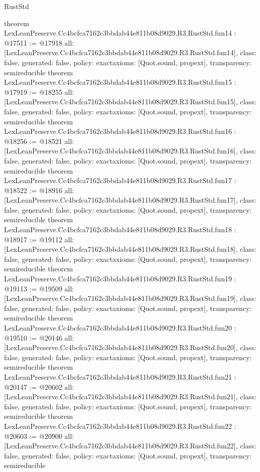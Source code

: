 \begin{lexlean}{RustStd}
\begin{coremodule}
{}
theorem LexLeanPreserve.Cc4bcfca7162c3bbdab44e811b08d9029.R3.RustStd.fun14 : @17511 := @17918 {
  all: [LexLeanPreserve.Cc4bcfca7162c3bbdab44e811b08d9029.R3.RustStd.fun14],
  class: false,
  generated: false,
  policy: exact{axioms: [Quot.sound, propext]},
  transparency: semireducible
}
theorem LexLeanPreserve.Cc4bcfca7162c3bbdab44e811b08d9029.R3.RustStd.fun15 : @17919 := @18255 {
  all: [LexLeanPreserve.Cc4bcfca7162c3bbdab44e811b08d9029.R3.RustStd.fun15],
  class: false,
  generated: false,
  policy: exact{axioms: [Quot.sound, propext]},
  transparency: semireducible
}
theorem LexLeanPreserve.Cc4bcfca7162c3bbdab44e811b08d9029.R3.RustStd.fun16 : @18256 := @18521 {
  all: [LexLeanPreserve.Cc4bcfca7162c3bbdab44e811b08d9029.R3.RustStd.fun16],
  class: false,
  generated: false,
  policy: exact{axioms: [Quot.sound, propext]},
  transparency: semireducible
}
theorem LexLeanPreserve.Cc4bcfca7162c3bbdab44e811b08d9029.R3.RustStd.fun17 : @18522 := @18916 {
  all: [LexLeanPreserve.Cc4bcfca7162c3bbdab44e811b08d9029.R3.RustStd.fun17],
  class: false,
  generated: false,
  policy: exact{axioms: [Quot.sound, propext]},
  transparency: semireducible
}
theorem LexLeanPreserve.Cc4bcfca7162c3bbdab44e811b08d9029.R3.RustStd.fun18 : @18917 := @19112 {
  all: [LexLeanPreserve.Cc4bcfca7162c3bbdab44e811b08d9029.R3.RustStd.fun18],
  class: false,
  generated: false,
  policy: exact{axioms: [Quot.sound, propext]},
  transparency: semireducible
}
theorem LexLeanPreserve.Cc4bcfca7162c3bbdab44e811b08d9029.R3.RustStd.fun19 : @19113 := @19509 {
  all: [LexLeanPreserve.Cc4bcfca7162c3bbdab44e811b08d9029.R3.RustStd.fun19],
  class: false,
  generated: false,
  policy: exact{axioms: [Quot.sound, propext]},
  transparency: semireducible
}
theorem LexLeanPreserve.Cc4bcfca7162c3bbdab44e811b08d9029.R3.RustStd.fun20 : @19510 := @20146 {
  all: [LexLeanPreserve.Cc4bcfca7162c3bbdab44e811b08d9029.R3.RustStd.fun20],
  class: false,
  generated: false,
  policy: exact{axioms: [Quot.sound, propext]},
  transparency: semireducible
}
theorem LexLeanPreserve.Cc4bcfca7162c3bbdab44e811b08d9029.R3.RustStd.fun21 : @20147 := @20602 {
  all: [LexLeanPreserve.Cc4bcfca7162c3bbdab44e811b08d9029.R3.RustStd.fun21],
  class: false,
  generated: false,
  policy: exact{axioms: [Quot.sound, propext]},
  transparency: semireducible
}
theorem LexLeanPreserve.Cc4bcfca7162c3bbdab44e811b08d9029.R3.RustStd.fun22 : @20603 := @20900 {
  all: [LexLeanPreserve.Cc4bcfca7162c3bbdab44e811b08d9029.R3.RustStd.fun22],
  class: false,
  generated: false,
  policy: exact{axioms: [Quot.sound, propext]},
  transparency: semireducible
}
\end{coremodule}
\end{lexlean}
